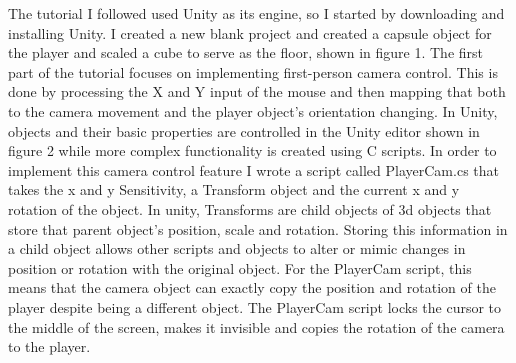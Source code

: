 \documentclass[10pt,twocolumn]{article}
\begin{document}
The tutorial I followed\cite{UnityTutorial} used Unity as its engine, so I started by downloading and installing Unity. I created a new blank project and created a capsule object for the player and scaled a cube to serve as the floor, shown in figure 1. The first part of the tutorial focuses on implementing first-person camera control. This is done by processing the X and Y input of the mouse and then mapping that both to the camera movement and the player object's orientation changing. In Unity, objects and their basic properties are controlled in the Unity editor shown in figure 2 while more complex functionality is created using C\text{\#} scripts. In order to implement this camera control feature I wrote a script called PlayerCam.cs that takes the x and y Sensitivity, a Transform object and the current x and y rotation of the object. In unity, Transforms are child objects of 3d objects that store that parent object's position, scale and rotation. Storing this information in a child object allows other scripts and objects to alter or mimic changes in position or rotation with the original object. For the PlayerCam script, this means that the camera object can exactly copy the position and rotation of the player despite being a different object. The PlayerCam script locks the cursor to the middle of the screen, makes it invisible and copies the rotation of the camera to the player.
\end{document}
